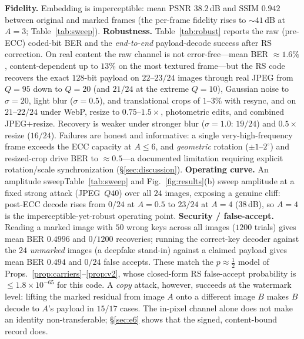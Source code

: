 \documentclass[journal]{IEEEtran}
\begin{document}
\textbf{Fidelity.} Embedding is imperceptible: mean PSNR $38.2$\,dB and SSIM
$0.942$ between original and marked frames (the per-frame fidelity rises to
$\sim\!41$\,dB at $A\!=\!3$\ifshort\else; Table~\ref{tab:sweep}\fi). \textbf{Robustness.}
Table~\ref{tab:robust} reports the raw (pre-ECC) coded-bit BER and the
\emph{end-to-end} payload-decode success after RS correction. On real content the
raw channel is not error-free---mean BER $\approx\!1.6\%$, content-dependent up to
$13\%$ on the most textured frame---but the RS code recovers the exact $128$-bit
payload on \mbox{$22$--$23/24$} images through real JPEG from $Q\!=\!95$ down to
$Q\!=\!20$ (and $21/24$ at the extreme $Q\!=\!10$), Gaussian noise to
$\sigma\!=\!20$, light blur ($\sigma\!=\!0.5$), and translational crops of
$1$--$3\%$ with resync, and on $21$--$22/24$ under WebP, resize to
$0.75$--$1.5\times$, photometric edits, and combined JPEG$+$resize. Recovery is weaker under
stronger blur ($\sigma\!=\!1.0$: $19/24$) and $0.5\times$ resize ($16/24$).
Failures are honest and informative: a single
very-high-frequency frame exceeds the ECC capacity at $A\!\le\!6$, and
\emph{geometric} rotation ($\pm1$--$2^\circ$) and resized-crop drive BER to
$\approx\!0.5$---a documented limitation requiring explicit rotation/scale
synchronization (\S\ref{sec:discussion}). \textbf{Operating curve.}
\ifshort An amplitude sweep\else Table~\ref{tab:sweep} and Fig.~\ref{fig:results}(b) sweep amplitude\fi{} at a fixed
strong attack (JPEG~$Q40$) over all $24$ images, exposing a genuine cliff:
post-ECC decode rises from $0/24$ at $A\!=\!0.5$ to $23/24$ at $A\!=\!4$
($38$\,dB), so $A\!=\!4$ is the imperceptible-yet-robust operating point.
\textbf{Security / false-accept.} Reading a marked image with $50$ wrong keys
across all images ($1200$ trials) gives mean BER $0.4996$ and $0/1200$
recoveries; running the correct-key decoder against the $24$ \emph{unmarked}
images (a deepfake stand-in) against a claimed payload gives mean BER $0.494$ and
$0/24$ false accepts. These match the $p\!\approx\!\tfrac12$ model of
Props.~\ref{prop:carriers}--\ref{prop:v2}, whose closed-form RS false-accept
probability is $\le\!1.8\times10^{-65}$ for this code. A \emph{copy} attack,
however, succeeds at the watermark level: lifting the marked residual from image
$A$ onto a different image $B$ makes $B$ decode to $A$'s payload in $15/17$
cases. The in-pixel channel alone does not make an identity non-transferable;
\S\ref{sec:e6} shows that the signed, content-bound record does.
\end{document}
